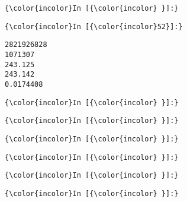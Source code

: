 \documentclass[11pt]{article}
\begin{document}
    \begin{Verbatim}[commandchars=\\\{\}]
{\color{incolor}In [{\color{incolor} }]:} 
\end{Verbatim}

    \begin{Verbatim}[commandchars=\\\{\}]
{\color{incolor}In [{\color{incolor}52}]:} 
\end{Verbatim}

    \begin{Verbatim}[commandchars=\\\{\}]
2821926828
1071307
243.125
243.142
0.0174408

    \end{Verbatim}

    \begin{Verbatim}[commandchars=\\\{\}]
{\color{incolor}In [{\color{incolor} }]:} 
\end{Verbatim}

    \begin{Verbatim}[commandchars=\\\{\}]
{\color{incolor}In [{\color{incolor} }]:} 
\end{Verbatim}

    \begin{Verbatim}[commandchars=\\\{\}]
{\color{incolor}In [{\color{incolor} }]:} 
\end{Verbatim}

    \begin{Verbatim}[commandchars=\\\{\}]
{\color{incolor}In [{\color{incolor} }]:} 
\end{Verbatim}

    \begin{Verbatim}[commandchars=\\\{\}]
{\color{incolor}In [{\color{incolor} }]:} 
\end{Verbatim}

    \begin{Verbatim}[commandchars=\\\{\}]
{\color{incolor}In [{\color{incolor} }]:} 
\end{Verbatim}


    
    
    
    
\end{document}
